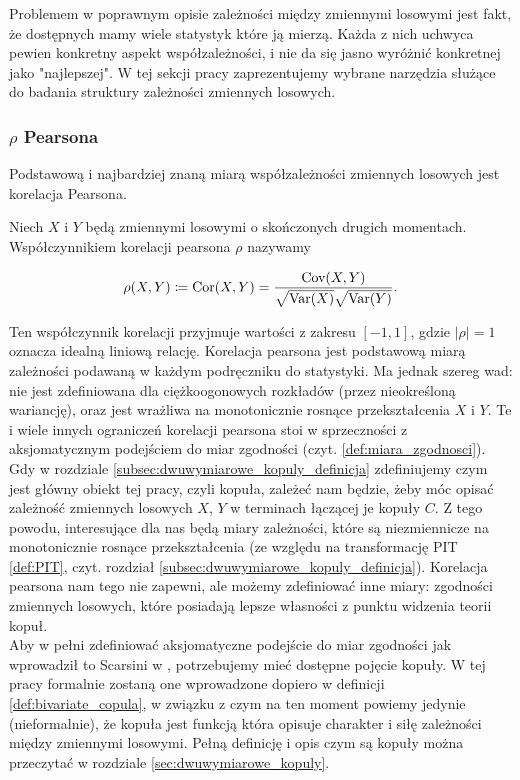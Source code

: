 Problemem w poprawnym opisie zależności między zmiennymi losowymi jest fakt, że dostępnych mamy wiele statystyk które ją mierzą. Każda z nich uchwyca pewien konkretny aspekt współzależności, i nie da się jasno wyróżnić konkretnej jako "najlepszej". W tej sekcji pracy zaprezentujemy wybrane narzędzia służące do badania struktury zależności zmiennych losowych.

\subsubsection{$\rho$ Pearsona}
Podstawową i najbardziej znaną miarą współzależności zmiennych losowych jest korelacja Pearsona.

\begin{df}
	Niech $X$ i $Y$ będą zmiennymi losowymi o skończonych drugich momentach. Współczynnikiem korelacji pearsona $\rho$ nazywamy
	
	$$ \rho(X, Y) \coloneqq \text{Cor}(X,Y) = \frac{\text{Cov}(X,Y)}{\sqrt{\text{Var}(X)}\sqrt{\text{Var}(Y)}}.$$
\end{df}

Ten współczynnik korelacji przyjmuje wartości z zakresu $[-1, 1]$, gdzie $\vert\rho\vert=1$ oznacza idealną liniową relację. Korelacja pearsona jest podstawową miarą zależności podawaną w każdym podręczniku do statystyki. Ma jednak szereg wad: nie jest zdefiniowana dla ciężkoogonowych rozkładów (przez nieokreśloną wariancję), oraz jest wrażliwa na monotonicznie rosnące przekształcenia $X$ i $Y$. Te i wiele innych ograniczeń korelacji pearsona stoi w sprzeczności z aksjomatycznym podejściem do miar zgodności (czyt. \ref{def:miara_zgodnosci}). \\
Gdy w rozdziale \ref{subsec:dwuwymiarowe_kopuly_definicja} zdefiniujemy czym jest główny obiekt tej pracy, czyli kopuła, zależeć nam będzie, żeby móc opisać zależność zmiennych losowych $X$, $Y$ w terminach łączącej je kopuły $C$. Z tego powodu, interesujące dla nas będą miary zależności, które są niezmiennicze na monotonicznie rosnące przekształcenia (ze względu na transformację PIT \ref{def:PIT}, czyt. rozdział \ref{subsec:dwuwymiarowe_kopuly_definicja}). Korelacja pearsona nam tego nie zapewni, ale możemy zdefiniować inne miary: zgodności zmiennych losowych, które posiadają lepsze własności z punktu widzenia teorii kopuł.\\

Aby w pełni zdefiniować aksjomatyczne podejście do miar zgodności jak wprowadził to Scarsini w \cite{Scarsini1984}, potrzebujemy mieć dostępne pojęcie kopuły. W tej pracy formalnie zostaną one wprowadzone dopiero w definicji \ref{def:bivariate_copula}, w związku z czym na ten moment powiemy jedynie (nieformalnie), że kopuła jest funkcją która opisuje charakter i siłę zależności między zmiennymi losowymi. Pełną definicję i opis czym są kopuły można przeczytać w rozdziale \ref{sec:dwuwymiarowe_kopuly}.


